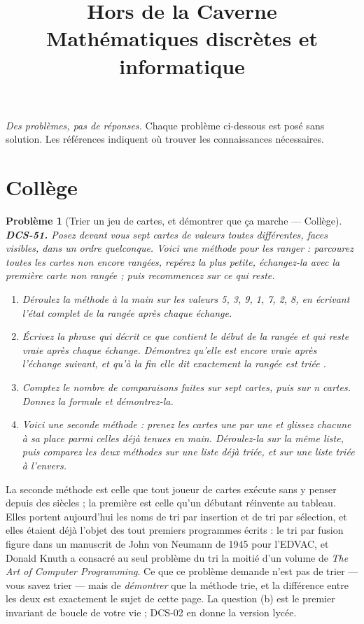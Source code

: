 \documentclass[11pt]{article}
\title{Hors de la Caverne \\ \Large Mathématiques discrètes et informatique}
\author{}
\date{}
\newtheorem{problem}{Problème}
\begin{document}
\maketitle
\noindent\emph{Des problèmes, pas de réponses.} Chaque problème ci-dessous est posé
sans solution. Les références indiquent où trouver les connaissances nécessaires.
\medskip


\section*{Collège}

\begin{problem}[{Trier un jeu de cartes, et démontrer que ça marche --- Collège}]
\textbf{DCS-51.} Posez devant vous sept cartes de valeurs toutes différentes, faces
visibles, dans un ordre quelconque. Voici une méthode pour les ranger : parcourez toutes les
cartes non encore rangées, repérez la plus petite, échangez-la avec la première carte non
rangée ; puis recommencez sur ce qui reste.
\begin{enumerate}
\item[(a)] Déroulez la méthode à la main sur les valeurs 5, 3, 9, 1, 7, 2, 8, en écrivant l'état
complet de la rangée après chaque échange.
\item[(b)] Écrivez la phrase qui décrit ce que contient le début de la rangée et qui reste vraie
après chaque échange. Démontrez qu'elle est encore vraie après l'échange suivant, et qu'à la
fin elle dit exactement \og{} la rangée est triée \fg{}.
\item[(c)] Comptez le nombre de comparaisons faites sur sept cartes, puis sur n cartes. Donnez la
formule et démontrez-la.
\item[(d)] Voici une seconde méthode : prenez les cartes une par une et glissez chacune à sa place
parmi celles déjà tenues en main. Déroulez-la sur la même liste, puis comparez les deux
méthodes sur une liste déjà triée, et sur une liste triée à l'envers.
\end{enumerate}

\end{problem}

\noindent La seconde méthode est celle que tout joueur de cartes exécute sans y
penser depuis des siècles ; la première est celle qu'un débutant réinvente au tableau. Elles
portent aujourd'hui les noms de tri par insertion et de tri par sélection, et elles étaient
déjà l'objet des tout premiers programmes écrits : le tri par fusion figure dans un
manuscrit de John von Neumann de 1945 pour l'EDVAC, et Donald Knuth a consacré au seul
problème du tri la moitié d'un volume de \textit{The Art of Computer Programming}. Ce que ce
problème demande n'est pas de trier --- vous savez trier --- mais de \textit{démontrer} que la
méthode trie, et la différence entre les deux est exactement le sujet de cette page. La
question (b) est le premier invariant de boucle de votre vie ; DCS-02 en donne la version
lycée.
\end{document}
